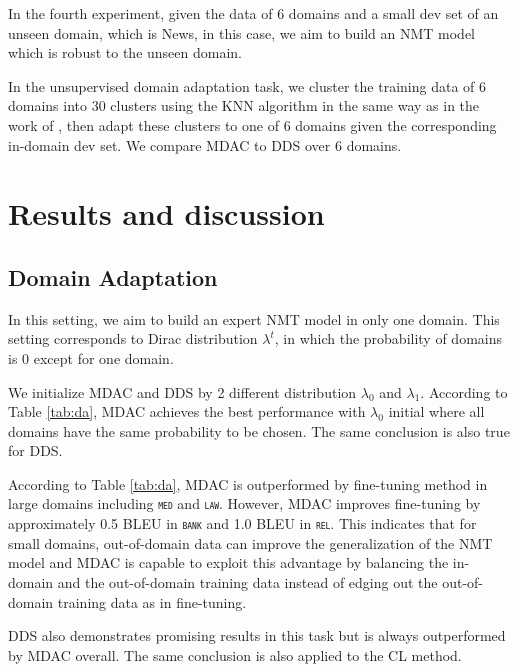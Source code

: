 \documentclass[11pt]{article}
\newcommand{\domain}[1]{\texttt{\textsc{#1}}}
\begin{document}
In the fourth experiment, given the data of 6 domains and a small dev set of an unseen domain, which is News, in this case, we aim to build an NMT model which is robust to the unseen domain.

In the unsupervised domain adaptation task, we cluster the training data of 6 domains into 30 clusters using the KNN algorithm in the same way as in the work of \citet{Tars18multidomain}, then adapt these clusters to one of 6 domains given the corresponding in-domain dev set. We compare MDAC to DDS over 6 domains.

\section{Results and discussion \label{sec:results}}

\subsection{Domain Adaptation}
In this setting, we aim to build an expert NMT model in only one domain. This setting corresponds to Dirac distribution $\lambda^t$, in which the probability of domains is 0 except for one domain.

We initialize MDAC and DDS by 2 different distribution $\lambda_0$ and $\lambda_1$. According to Table \ref{tab:da}, MDAC achieves the best performance with $\lambda_0$ initial where all domains have the same probability to be chosen. The same conclusion is also true for DDS.

According to Table \ref{tab:da}, MDAC is outperformed by fine-tuning method in large domains including \domain{med} and \domain{law}. However, MDAC improves fine-tuning by approximately 0.5 BLEU in \domain{bank} and 1.0 BLEU in \domain{rel}. This indicates that for small domains, out-of-domain data can improve the generalization of the NMT model and MDAC is capable to exploit this advantage by balancing the in-domain and the out-of-domain training data instead of edging out the out-of-domain training data as in fine-tuning.

DDS also demonstrates promising results in this task but is always outperformed by MDAC overall. The same conclusion is also applied to the CL method.
\end{document}
